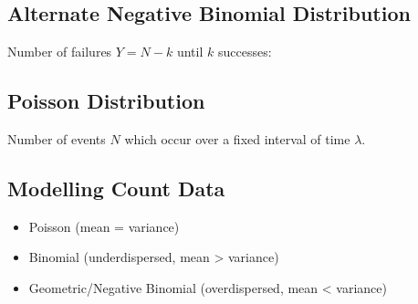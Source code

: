 \documentclass{article}
\begin{document}
\begin{minipage}{62.39259259mm}
    \subsection{Alternate Negative Binomial Distribution}
    Number of failures \(Y = N - k\) until \(k\) successes:
    \subsection{Poisson Distribution}
    Number of events \(N\) which occur over a fixed interval of time
    \(\lambda\).
    \subsection{Modelling Count Data}
    \begin{itemize}
        \setlength\itemsep{-0.2em}
        \item Poisson (mean = variance)
        \item Binomial (underdispersed, mean > variance)
        \item Geometric/Negative Binomial \newline (overdispersed, mean
              < variance)
    \end{itemize}
\end{minipage}
\end{document}
